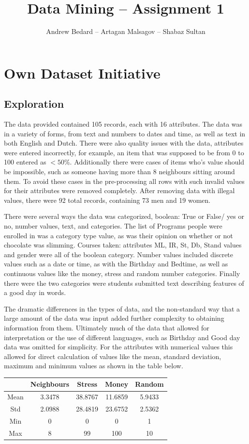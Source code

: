 \documentclass{llncs}
\title{Data Mining -- Assignment 1}
\author{Andrew Bedard -- Artagan Malsagov -- Shabaz Sultan}
\begin{document}
\maketitle
\section{Own Dataset Initiative}
\subsection*{Exploration}
The data provided contained 105 records, each with 16 attributes. The data was in a variety of forms, from text and numbers to dates and time, as well as  text in both English and Dutch. There were also quality issues with the data, attributes were entered incorrectly, for example, an item that was supposed to be from 0 to 100 entered as $<50$\%. Additionally there were cases of items who's value should be impossible, such as someone having more than 8 neighbours sitting around them. To avoid these cases in the pre-processing all rows with such invalid values for their attributes were removed completely. After removing data with illegal values, there were 92 total records, containing 73 men and 19 women.


There were several ways the data was categorized, boolean: True or False/ yes or no, number values, text, and categories. The list of Programs people were enrolled in was a category type value, as was their opinion on whether or not chocolate was slimming. Courses taken: attributes ML, IR, St, Db, Stand values and gender were all of the boolean category. Number values included discrete values such as a date or time, as with the Birthday and Bedtime, as well as continuous values like the money, stress and random number categories. Finally there were the two categories were students submitted text describing features of a good day in words.


The dramatic differences in the types of data, and the non-standard way that a large amount of the data was input added further complexity to obtaining information from them. Ultimately much of the data that allowed for interpretation or the use of different languages, such as Birthday and Good day data was omitted for simplicity. For the attributes with numerical values this allowed for direct calculation of values like the mean, standard deviation, maximum and minimum values as shown in the table below.

\begin{table}[H]
\centering
\begin{tabular}{|c|c|c|c|c|}
\hline 
 & Neighbours & Stress & Money & Random \\ 
\hline 
Mean & 3.3478 & 38.8767 & 11.6859 & 5.9433 \\ 
\hline 
Std & 2.0988 & 28.4819 & 23.6752 & 2.5362 \\ 
\hline 
Min & 0 & 0 & 0 & 1 \\ 
\hline 
Max & 8 & 99 & 100 & 10 \\ 
\hline 
\end{tabular} 
\end{table}
\end{document}
